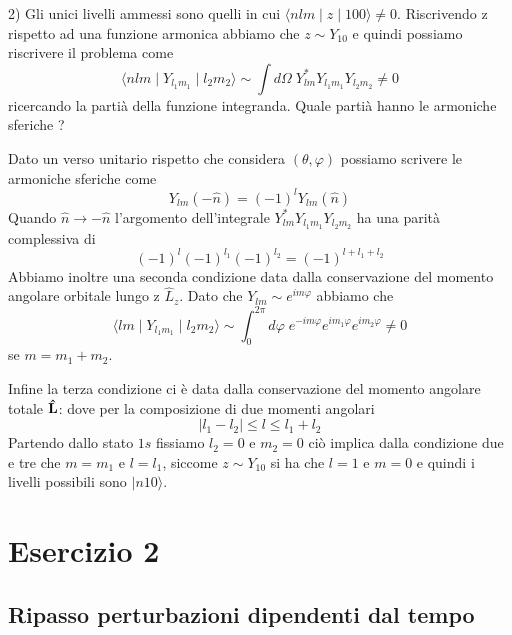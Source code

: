 2) Gli unici livelli ammessi sono quelli in cui $\langle nlm \mid z \mid 100 \rangle \neq 0$. Riscrivendo z rispetto ad una funzione armonica abbiamo che $z \sim Y_{10}$ e quindi possiamo riscrivere il problema come 
\begin{equation*}
	\langle nlm \mid Y_{l_1m_1} \mid l_2m_2 \rangle \sim \int d\Omega \; Y_{lm}^*Y_{l_1m_1}Y_{l_2m_2} \neq 0
\end{equation*}
ricercando la parti\`a della funzione integranda. Quale parti\`a hanno le armoniche sferiche ?

Dato un verso unitario rispetto che considera $(\theta,\varphi)$ possiamo scrivere le armoniche sferiche come 
\begin{equation*}
	Y_{lm}(-\hat{n}) = (-1)^lY_{lm}(\hat{n})
\end{equation*}
Quando $\hat{n} \to - \hat{n}$ l'argomento dell'integrale $ Y_{lm}^*Y_{l_1m_1}Y_{l_2m_2} $ ha una parit\`a complessiva di 
\begin{equation*}
	(-1)^{l}(-1)^{l_1}(-1)^{l_2} = (-1)^{l+l_1+l_2}
\end{equation*}
Abbiamo inoltre una seconda condizione data dalla conservazione del momento angolare orbitale lungo z $\hat{L}_z$. Dato che $Y_{lm} \sim e^{im\varphi}$ abbiamo che 
\begin{equation*}
	\langle lm \mid Y_{l_1m_1} \mid l_2m_2 \rangle \sim \int_0^{2\pi} d \varphi \; e^{-im\varphi}e^{im_1\varphi}e^{im_2 \varphi} \neq 0
\end{equation*}
se  $m = m_1 +m_2$. 

Infine la terza condizione ci \` e data dalla conservazione del momento angolare totale $\bold{\hat{L}}$: dove per la composizione di due momenti angolari
\begin{equation*}
	|l_1-l_2| \leq l \leq l_1 + l_2
\end{equation*}
Partendo dallo stato $1s$ fissiamo $l_2 = 0 $ e $m_2 = 0 $ ci\`o implica dalla condizione due e tre che $m = m_1$ e $l = l _1$, siccome $z \sim Y_{10}$ si ha che $l = 1$ e $m= 0$ e quindi i livelli possibili sono $|n10\rangle $. 

\section{Esercizio 2}

\subsection{Ripasso perturbazioni dipendenti dal tempo}

